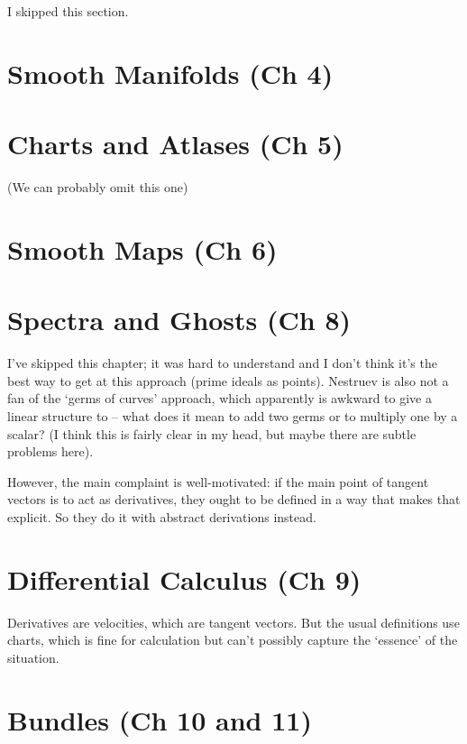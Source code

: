 \documentclass[oneside,english]{amsbook}
\numberwithin{section}{chapter}
\theoremstyle{plain}
\theoremstyle{definition}
\begin{document}
I skipped this section.

\section{Smooth Manifolds (Ch 4)}

\section{Charts and Atlases (Ch 5)}
(We can probably omit this one)

\section{Smooth Maps (Ch 6)}

\section{Spectra and Ghosts (Ch 8)}

I've skipped this chapter; it was hard to understand and I don't think it's the best way to get at this approach (prime ideals as points). Nestruev is also not a fan of the `germs of curves' approach, which apparently is awkward to give a linear structure to -- what does it mean to add two germs or to multiply one by a scalar? (I think this is fairly clear in my head, but maybe there are subtle problems here).

However, the main complaint is well-motivated: if the main point of tangent vectors is to act as derivatives, they ought to be defined in a way that makes that explicit. So they do it with abstract derivations instead.







\section{Differential Calculus (Ch 9)}

Derivatives are velocities, which are tangent vectors. But the usual definitions use charts, which is fine for calculation but can't possibly capture the `essence' of the situation.





\section{Bundles (Ch 10 and 11)}
\end{document}
